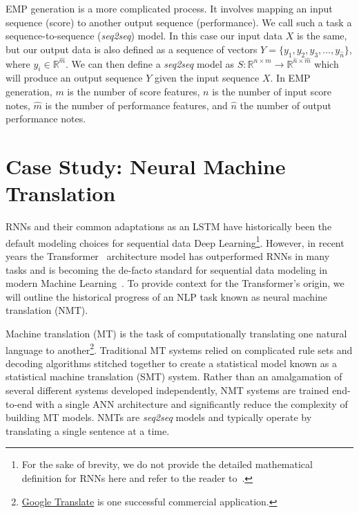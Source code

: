 \newcommand{\seq}{\emph{seq2seq}}

EMP generation is a more complicated process. It involves mapping an input sequence (score) to another output sequence (performance). We call such a task a sequence-to-sequence (\seq{}) model. In this case our input data $X$ is the same, but our output data is also defined as a sequence of vectors $Y = \{y_1, y_2, y_3, ..., y_{\hat{n}}\}$, where $y_i \in \mathbb{R}^{\hat{m}}$. We can then define a \seq{} model as $S: \mathbb{R}^{n \times m} \rightarrow \mathbb{R}^{\hat{n} \times \hat{m}}$ which will produce an output sequence $Y$ given the input sequence $X$. In EMP generation, $m$ is the number of score features, $n$ is the number of input score notes, $\hat{m}$ is the number of performance features, and $\hat{n}$ the number of output performance notes. 

\section{Case Study: Neural Machine Translation}
RNNs and their common adaptations as an LSTM have historically been the default modeling choices for sequential data Deep Learning\footnote{For the sake of brevity, we do not provide the detailed mathematical definition for RNNs here and refer to the reader to~\citet{goodfellow2016deep}.}. However, in recent years the Transformer~\cite{vaswani2017attention} architecture model has outperformed RNNs in many tasks and is becoming the de-facto standard for sequential data modeling in modern Machine Learning~\cite{devlin2018bert, brown2020language}. To provide context for the Transformer's origin, we will outline the historical progress of an NLP task known as neural machine translation (NMT). 

Machine translation (MT) is the task of computationally translating one natural language to another\footnote{\href{https://translate.google.com/}{Google Translate} is one successful commercial application.}. Traditional MT systems relied on complicated rule sets and decoding algorithms stitched together to create a statistical model known as a statistical machine translation (SMT) system. Rather than an amalgamation of several different systems developed independently, NMT systems are trained end-to-end with a single ANN architecture and significantly reduce the complexity of building MT models. NMTs are \seq{} models and typically operate by translating a single sentence at a time.

